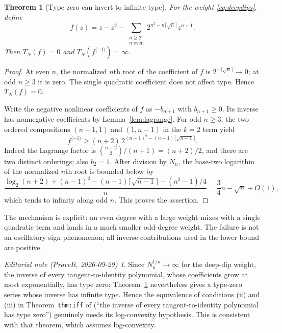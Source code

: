 \documentclass[11pt,a4paper]{article}
\numberwithin{equation}{section}
\newtheorem{theorem}{Theorem}[section]
\theoremstyle{definition}
\theoremstyle{remark}
\newtheorem*{ednote}{Editorial note (ProveIt, 2026-09-29)}
\newcommand{\Type}{T_N}
\newcommand{\inv}[1]{#1^{\langle-1\rangle}}
\begin{document}
\begin{theorem}[Type zero can invert to infinite type]
\label{thm:zerotoinfinity}
For the weight \eqref{eq:deepdips}, define
\begin{equation}
 f(z)=z-z^2-
 \sum_{\substack{n\ge2\\n\text{ even}}}
          2^{n^2-n\lceil\sqrt n\rceil}z^{n+1}.
 \label{eq:zerotoinfinityseries}
\end{equation}
Then $\Type(f)=0$ and $\Type(\inv f)=\infty$.
\end{theorem}
\begin{proof}
At even $n$, the normalized $n$th root of the coefficient of $f$ is
$2^{-\lceil\sqrt n\rceil}\to0$; at odd $n\ge3$ it is zero. The
single quadratic coefficient does not affect type. Hence $\Type(f)=0$.

Write the negative nonlinear coefficients of $f$ as $-b_{n+1}$ with
$b_{n+1}\ge0$. Its inverse has nonnegative coefficients by
Lemma~\ref{lem:lagrange}. For odd $n\ge3$, the two ordered compositions
$(n-1,1)$ and $(1,n-1)$ in the $k=2$ term yield
\begin{equation}
 [z^{n+1}]\inv f\ge
 (n+2)\,2^{(n-1)^2-(n-1)\lceil\sqrt{n-1}\rceil}.
 \label{eq:zerotoinfinitylower}
\end{equation}
Indeed the Lagrange factor is
$\binom{n+2}{2}/(n+1)=(n+2)/2$, and there are two distinct orderings;
also $b_2=1$. After division by $N_n$, the base-two logarithm of the
normalized $n$th root is bounded below by
\[
 \frac{\log_2(n+2)+(n-1)^2
 -(n-1)\lceil\sqrt{n-1}\rceil-(n^2-1)/4}{n}
 =\frac34n-\sqrt n+O(1),
\]
which tends to infinity along odd $n$. This proves the assertion.
\end{proof}

The mechanism is explicit: an even degree with a large weight mixes with
a single quadratic term and lands in a much smaller odd-degree weight.
The failure is not an oscillatory sign phenomenon; all inverse
contributions used in the lower bound are positive.
\begin{ednote}
Since $N_n^{1/n}\to\infty$ for the deep-dip weight, the inverse of every
tangent-to-identity polynomial, whose coefficients grow at most
exponentially, has type zero; Theorem~\ref{thm:zerotoinfinity}
nevertheless gives a type-zero series whose inverse has infinite type.
Hence the equivalence of conditions (ii) and (iii) in Theorem~\texttt{thm:iff}
of \cite{repo-weight} (``the inverse of every tangent-to-identity polynomial
has type zero'') genuinely needs its log-convexity hypothesis. This is
consistent with that theorem, which assumes log-convexity.
\end{ednote}
\end{document}
